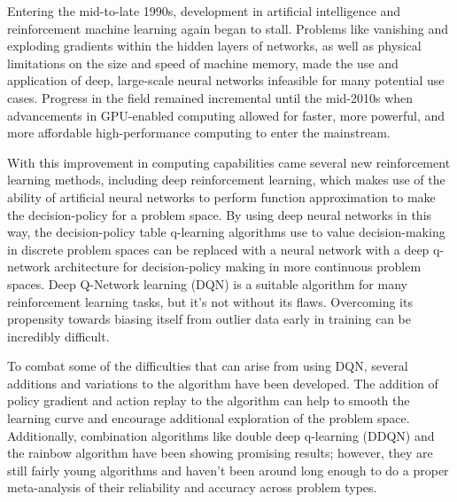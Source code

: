 Entering the mid-to-late 1990s, development in artificial intelligence and reinforcement machine learning again began to stall. Problems like vanishing and exploding gradients within the hidden layers of networks, as well as physical limitations on the size and speed of machine memory, made the use and application of deep, large-scale neural networks infeasible for many potential use cases. Progress in the field remained incremental until the mid-2010s when advancements in GPU-enabled computing allowed for faster, more powerful, and more affordable high-performance computing to enter the mainstream.

With this improvement in computing capabilities came several new reinforcement learning methods, including deep reinforcement learning, which makes use of the ability of artificial neural networks to perform function approximation to make the decision-policy for a problem space. By using deep neural networks in this way, the decision-policy table q-learning algorithms use to value decision-making in discrete problem spaces can be replaced with a neural network with a deep q-network architecture for decision-policy making in more continuous problem spaces.
Deep Q-Network learning (DQN) is a suitable algorithm for many reinforcement learning tasks, but it's not without its flaws. Overcoming its propensity towards biasing itself from outlier data early in training can be incredibly difficult. \cite{fujimoto2018addressing}

To combat some of the difficulties that can arise from using DQN, 
several additions and variations to the algorithm have been developed. 
The addition of policy gradient \cite{nweke2018deep}
and action replay \cite{zhao2016deep} 
to the algorithm can help to smooth the learning curve and encourage 
additional exploration of the problem space. 
Additionally, 
combination algorithms like double deep q-learning (DDQN) \cite{ddqn16} 
and the rainbow algorithm \cite{rainbow18}
have been showing promising results; however, 
they are still fairly young algorithms and haven't been around 
long enough to do a proper meta-analysis of their reliability and 
accuracy across problem types.

